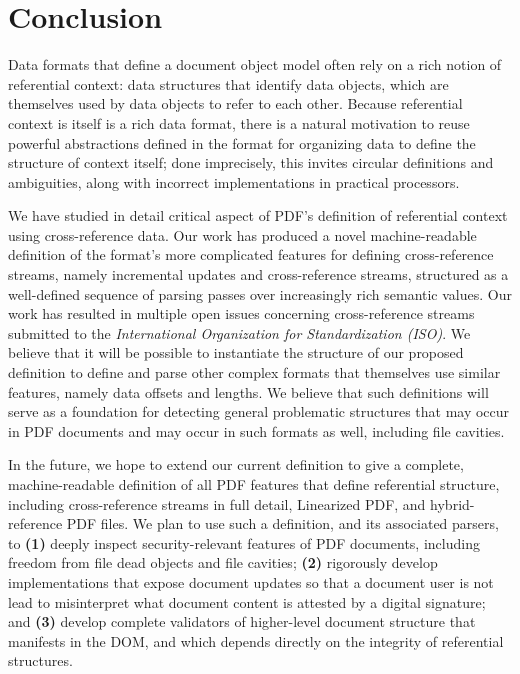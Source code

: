 \section{Conclusion}
\label{sec:conclusion}
Data formats that define a document object model often rely on a rich
notion of referential context: data structures that identify data
objects, which are themselves used by data objects to refer to each
other.
%
Because referential context is itself is a rich data format, there is
a natural motivation to reuse powerful abstractions defined in the
format for organizing data to define the structure of context itself;
%
done imprecisely, this invites circular definitions and ambiguities,
along with incorrect implementations in practical processors.

We have studied in detail critical aspect of PDF's definition of
referential context using cross-reference data.
%
Our work has produced a novel machine-readable definition of the
format's more complicated features for defining cross-reference
streams, namely incremental updates and cross-reference streams,
structured as a well-defined sequence of parsing passes over
increasingly rich semantic values.
%
Our work has resulted in multiple open issues concerning
cross-reference streams submitted to the \emph{International
  Organization for Standardization (ISO)}.
%
We believe that it will be possible to instantiate the structure of
our proposed definition to define and parse other complex formats
that themselves use similar features, namely data offsets and lengths.
%
We believe that such definitions will serve as a foundation for
detecting general problematic structures that may occur in PDF
documents and may occur in such formats as well, including file
cavities.

In the future, we hope to extend our current definition to give a
complete, machine-readable definition of all PDF features that define
referential structure, including cross-reference streams in full
detail, Linearized PDF, and hybrid-reference PDF files.
%
We plan to use such a definition, and its associated parsers, to
% 
\textbf{(1)} deeply inspect security-relevant features of PDF
documents, including freedom from file dead objects and file cavities;
%
\textbf{(2)} rigorously develop implementations that expose document
updates so that a document user is not lead to misinterpret what
document content is attested by a digital signature; and
% 
\textbf{(3)} develop complete validators of higher-level document
structure that manifests in the DOM, and which depends directly on the
integrity of referential structures.
